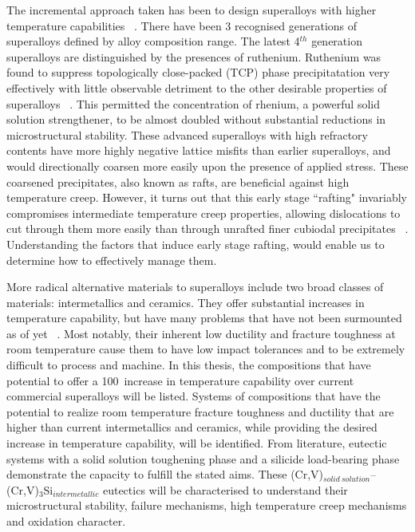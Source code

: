 The incremental approach taken has been to design superalloys with higher temperature capabilities ~\cite{reed06, cumpsty97}.   There have been 3 recognised generations of superalloys defined by alloy composition range. The latest 4$^{th}$ generation superalloys are distinguished by the presences of ruthenium.  Ruthenium was found to suppress topologically close-packed (TCP) phase precipitatation very effectively with little observable detriment to the other desirable properties of superalloys ~\cite{yeh04}.  This permitted the concentration of rhenium, a powerful solid solution strengthener, to be almost doubled without substantial reductions in microstructural stability.  These advanced superalloys with high refractory contents have more highly negative lattice misfits than earlier superalloys, and would directionally coarsen more easily upon the presence of applied stress.  These coarsened precipitates, also known as rafts, are beneficial against high temperature creep.  However, it turns out that this early stage ``rafting" invariably compromises intermediate temperature creep properties, allowing dislocations to cut through them more easily than through unrafted finer cubiodal precipitates ~\cite{hobbs08}.  Understanding the factors that induce early stage rafting, would enable us to determine how to effectively manage them.  

More radical alternative materials to superalloys include two broad classes of materials: intermetallics and ceramics. They offer substantial increases in temperature capability, but have many problems that have not been surmounted as of yet ~\cite{miracle94, kumar94, shah92, sauthoff88, kelly91, kelly96, jackson96, chang91, fleischer94, fleischer85a}. Most notably, their inherent low ductility and fracture toughness at room temperature cause them to have low impact tolerances and to be extremely difficult to process and machine. In this thesis, the compositions that have potential to offer a 100\celsius\ increase in temperature capability over current commercial superalloys will be listed. Systems of compositions that have the potential to realize room temperature fracture toughness and ductility that are higher than current intermetallics and ceramics, while providing the desired increase in temperature capability, will be identified. From literature, eutectic systems with a solid solution toughening phase and a silicide load-bearing phase demonstrate the capacity to fulfill the stated aims. These (Cr,V)$_{solid\ solution}$--(Cr,V)$_3$Si$_{intermetallic}$ eutectics will be characterised to understand their microstructural stability, failure mechanisms, high temperature creep mechanisms and oxidation character.
 
